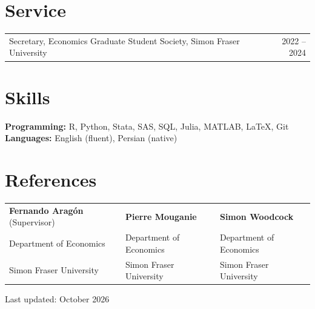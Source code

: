 \documentclass[11pt,letterpaper]{article}
\makeatletter
\newcommand{\entry}[2]{\noindent\begin{tabularx}{\linewidth}{@{}X r@{}}#1 & #2\end{tabularx}\par}
\makeatother
\begin{document}
\section{Service}
\entry{Secretary, Economics Graduate Student Society, Simon Fraser University}{2022 -- 2024}

\section{Skills}
\textbf{Programming:} R, Python, Stata, SAS, SQL, Julia, MATLAB, \LaTeX, Git\\
\textbf{Languages:} English (fluent), Persian (native)

\section{References}
\begin{tabularx}{\linewidth}{@{}X X X@{}}
\textbf{Fernando Arag\'on} (Supervisor) & \textbf{Pierre Mouganie} & \textbf{Simon Woodcock} \\
Department of Economics & Department of Economics & Department of Economics \\
Simon Fraser University & Simon Fraser University & Simon Fraser University \\
\end{tabularx}

\vfill
{\footnotesize Last updated: October 2026}
\end{document}
